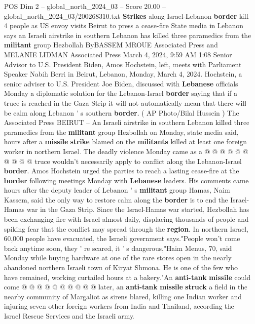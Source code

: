 \begin{textsample}{POS Dim 2 – global\_north\_2024\_03 – Score 20.00 – global\_north\_2024\_03/200268310.txt}  \label{ex:f2_pos_363}
\textbf{Strikes} along Israel-Lebanon \textbf{border} kill 4 people as US envoy visits Beirut to press a cease-fire State media in Lebanon says an Israeli airstrike in southern Lebanon has killed three paramedics from the \textbf{militant} group Hezbollah ByBASSEM MROUE Associated Press and MELANIE LIDMAN Associated Press March 4, 2024, 9:59 AM 1:08 Senior Advisor to U.S.
President Biden, Amos Hochstein, left, meets with Parliament Speaker Nabih Berri in Beirut, Lebanon, Monday, March 4, 2024.
Hochstein, a senior adviser to U.S.
President Joe Biden, discussed with \textbf{Lebanese} officials Monday a diplomatic solution for the Lebanon-Israel \textbf{border} saying that if a truce is reached in the Gaza Strip it will not automatically mean that there will be calm along Lebanon ' s southern \textbf{border}. ( AP Photo/Bilal Hussein ) The Associated Press BEIRUT -- An Israeli airstrike in southern Lebanon killed three paramedics from the \textbf{militant} group Hezbollah on Monday, state media said, hours after a \textbf{missile} \textbf{strike} blamed on the \textbf{militants} killed at least one foreign worker in northern Israel.
The deadly violence Monday came as a @ @ @ @ @ @ @ @ @ @ truce wouldn't necessarily apply to conflict along the Lebanon-Israel \textbf{border}.
Amos Hochstein urged the parties to reach a lasting cease-fire at the \textbf{border} following meetings Monday with \textbf{Lebanese} leaders.
His comments came hours after the deputy leader of Lebanon ' s \textbf{militant} group Hamas, Naim Kassem, said the only way to restore calm along the \textbf{border} is to end the Israel-Hamas war in the Gaza Strip.
Since the Israel-Hamas war started, Hezbollah has been exchanging fire with Israel almost daily, displacing thousands of people and spiking fear that the conflict may spread through the \textbf{region}.
In northern Israel, 60,000 people have evacuated, the Israeli government says."People won't come back anytime soon, they ' re scared, it ' s dangerous,"Haim Menus, 70, said Monday while buying hardware at one of the rare stores open in the nearly abandoned northern Israeli town of Kiryat Shmona.
He is one of the few who have remained, working curtailed hours at a bakery."An \textbf{anti-tank} \textbf{missile} could come @ @ @ @ @ @ @ @ @ @ later, an \textbf{anti-tank} \textbf{missile} \textbf{struck} a field in the nearby community of Margaliot as sirens blared, killing one Indian worker and injuring seven other foreign workers from India and Thailand, according the Israel Rescue Services and the Israeli army.

\end{textsample}
